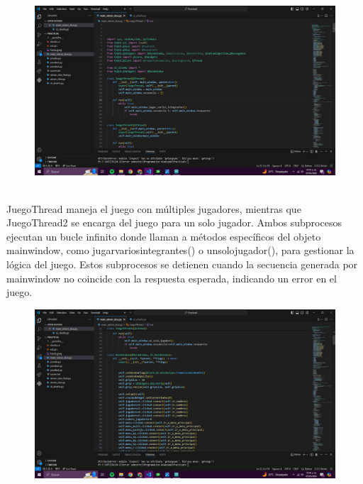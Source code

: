 \documentclass{article}
\begin{document}
{{\begin{figure}[h]
\end{figure}






\newpage
\begin{figure}[h]
    \centering
    \includegraphics[width=1\textwidth]{Captura de pantalla (764).png}
    
\end{figure}

{\Large \\JuegoThread maneja el juego con múltiples jugadores, mientras que JuegoThread2 se encarga del juego para un solo jugador. Ambos subprocesos ejecutan un bucle infinito donde llaman a métodos específicos del objeto mainwindow, como jugarvariosintegrantes() o unsolojugador(), para gestionar la lógica del juego. Estos subprocesos se detienen cuando la secuencia generada por mainwindow no coincide con la respuesta esperada, indicando un error en el juego.

}

\newpage
\begin{figure}[h]
    \centering
    \includegraphics[width=1\textwidth]{Captura de pantalla (765).png}
    

\end{figure}}}
\end{document}
